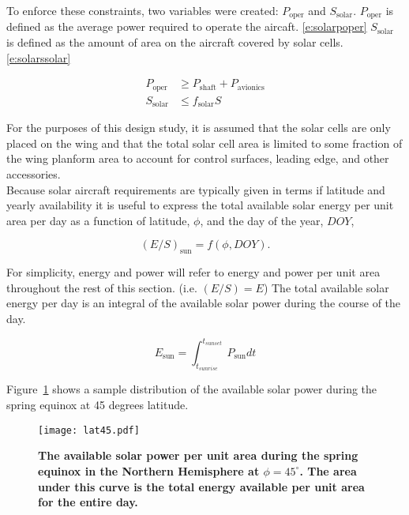 \documentclass[]{aiaa-tc}%
\begin{document}
    To enforce these constraints, two variables were created: $P_{\text{oper}}$ and $S_{\text{solar}}$. 
    $P_{\text{oper}}$ is defined as the average power required to operate the aircaft. \eqref{e:solarpoper} 
    $S_{\text{solar}}$ is defined as the amount of area on the aircraft covered by solar cells. \eqref{e:solarssolar}

    \begin{align}
        \label{e:solarpoper}
        P_{\text{oper}} &\geq P_{\text{shaft}} + P_{\text{avionics}} \\
        \label{e:solarssolar}
        S_{\text{solar}} &\leq f_{\text{solar}}S
    \end{align}

    For the purposes of this design study, it is assumed that the solar cells are only placed on the wing and that the total solar cell area is limited to some fraction of the wing planform area to account for control surfaces, leading edge, and other accessories.  \\

    Because solar aircraft requirements are typically given in terms if latitude and yearly availability it is useful to express the total available solar energy per unit area per day as a function of latitude, $\phi$, and the day of the year, $DOY$, 
    
    \begin{equation}
        \label{e:solarfunc}
        (E/S)_{\text{sun}} = f(\phi, DOY).
    \end{equation}


    For simplicity, energy and power will refer to energy and power per unit area throughout the rest of this section. (i.e. $(E/S) = E$) The total available solar energy per day is an integral of the available solar power during the course of the day.

    \begin{equation}
        \label{e:solares}
        E_{\text{sun}} = \int_{t_{sunrise}}^{t_{sunset}} P_{\text{sun}} dt
    \end{equation}

    Figure~\ref{f:lat45} shows a sample distribution of the available solar power during the spring equinox at 45 degrees latitude. 
    
\begin{figure}[H]
	\begin{center}
	\texttt{[image: lat45.pdf]}
    \caption{ \textbf{ The available solar power per unit area during the spring equinox in the Northern Hemisphere at $\phi=45^{\circ}$.  The area under this curve is the total energy available per unit area for the entire day.} }
	\label{f:lat45}
	\end{center}
\end{figure}
\end{document}

